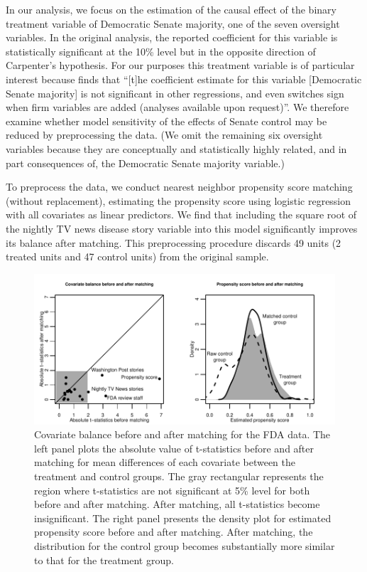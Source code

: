 \documentclass[11pt,titlepage]{article}
\begin{document}
In our analysis, we focus on the estimation of the causal effect of
the binary treatment variable of Democratic Senate majority, one of
the seven oversight variables. In the original analysis, the reported
coefficient for this variable is statistically significant at the 10\%
level but in the opposite direction of Carpenter's hypothesis.  For
our purposes this treatment variable is of particular interest because
\citet[p.498]{Carp02} finds that ``[t]he coefficient estimate for this
variable [Democratic Senate majority] is not significant in other
regressions, and even switches sign when firm variables are added
(analyses available upon request)''.  We therefore examine whether
model sensitivity of the effects of Senate control may be reduced by
preprocessing the data.  (We omit the remaining six oversight
variables because they are conceptually and statistically highly
related, and in part consequences of, the Democratic Senate majority
variable.)

To preprocess the data, we conduct nearest neighbor propensity score
matching (without replacement), estimating the propensity score using
logistic regression with all covariates as linear predictors. We find
that including the square root of the nightly TV news disease story
variable into this model significantly improves its balance after
matching. This preprocessing procedure discards 49 units (2 treated
units and 47 control units) from the original sample.

\begin{figure}[t] 
 \begin{center}
   \includegraphics{figs/fdabal.pdf}
  \end{center}
  \vspace{-0.275in}
  \caption{Covariate balance before and after matching for the FDA data.
    The left panel plots the absolute value of t-statistics before and
    after matching for mean differences of each covariate between the
    treatment and control groups. The gray rectangular represents the
    region where t-statistics are not significant at 5\% level for
    both before and after matching. After matching, all t-statistics
    become insignificant. The right panel presents the density plot
    for estimated propensity score before and after matching. After
    matching, the distribution for the control group becomes
    substantially more similar to that for the treatment group.}
  \label{fg:fdabal}
\end{figure}
\end{document}
